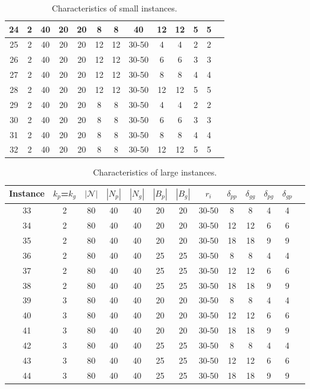 \documentclass[11pt]{article}
\begin{document}
\begin{itemize}
\begin{table}[t!]
\begin{tabular}{@{}ccccccccccccc@{}}
24 & 2 & 40 & 20 & 20 & 8 & 8 & 40 & 12 & 12 & 5 & 5 \\\hline
25 & 2 & 40 & 20 & 20 & 12 & 12 & 30-50 & 4 & 4 & 2 & 2 \\
26 & 2 & 40 & 20 & 20 & 12 & 12 & 30-50 & 6 & 6 & 3 & 3 \\
27 & 2 & 40 & 20 & 20 & 12 & 12 & 30-50 & 8 & 8 & 4 & 4 \\
28 & 2 & 40 & 20 & 20 & 12 & 12 & 30-50 & 12 & 12 & 5 & 5 \\\hline
29 & 2 & 40 & 20 & 20 & 8 & 8 & 30-50 & 4 & 4 & 2 & 2 \\
30 & 2 & 40 & 20 & 20 & 8 & 8 & 30-50 & 6 & 6 & 3 & 3 \\
31 & 2 & 40 & 20 & 20 & 8 & 8 & 30-50 & 8 & 8 & 4 & 4 \\
32 & 2 & 40 & 20 & 20 & 8 & 8 & 30-50 & 12 & 12 & 5 & 5 \\ \bottomrule
\end{tabular}
\caption{Characteristics of small instances.}
	\label{instance_information}%
\end{table}


\begin{table}[h!]
    \footnotesize
    \centering
\begin{tabular}{@{}ccccccccccccc@{}}
\toprule
Instance & $k_p$=$k_g$ & $|\mathcal{N}|$ & $|N_p|$ & $|N_g|$ & $|B_p|$ & $|B_g|$ & $r_i$ & $\delta_{pp}$ & $\delta_{gg}$ & $\delta_{pg}$ & $\delta_{gp}$ \\ \midrule
33 & 2 & 80 & 40 & 40 & 20 & 20 & 30-50 & 8 & 8 & 4 & 4 \\
34 & 2 & 80 & 40 & 40 & 20 & 20 & 30-50 & 12 & 12 & 6 & 6 \\
35 & 2 & 80 & 40 & 40 & 20 & 20 & 30-50 & 18 & 18 & 9 & 9 \\
36 & 2 & 80 & 40 & 40 & 25 & 25 & 30-50 & 8 & 8 & 4 & 4 \\
37 & 2 & 80 & 40 & 40 & 25 & 25 & 30-50 & 12 & 12 & 6 & 6 \\
38 & 2 & 80 & 40 & 40 & 25 & 25 & 30-50 & 18 & 18 & 9 & 9 \\\hline
39 & 3 & 80 & 40 & 40 & 20 & 20 & 30-50 & 8 & 8 & 4 & 4 \\
40 & 3 & 80 & 40 & 40 & 20 & 20 & 30-50 & 12 & 12 & 6 & 6 \\
41 & 3 & 80 & 40 & 40 & 20 & 20 & 30-50 & 18 & 18 & 9 & 9 \\
42 & 3 & 80 & 40 & 40 & 25 & 25 & 30-50 & 8 & 8 & 4 & 4 \\
43 & 3 & 80 & 40 & 40 & 25 & 25 & 30-50 & 12 & 12 & 6 & 6 \\
44 & 3 & 80 & 40 & 40 & 25 & 25 & 30-50 & 18 & 18 & 9 & 9 \\\bottomrule
\end{tabular}
\caption{Characteristics of large instances.}
	\label{_largeinstance_information}%
\end{table}



\end{itemize}
\end{document}
